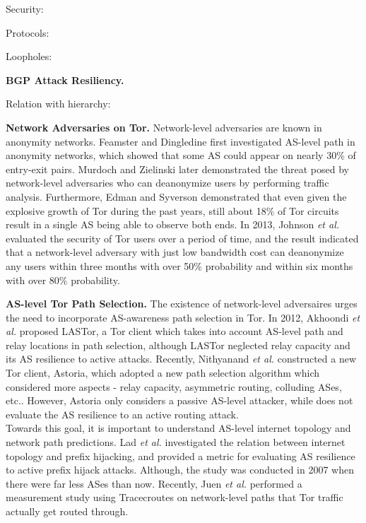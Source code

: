 \documentclass{acm_proc_article-sp}
\begin{document}
Security:
\cite{karlin2006pretty}
\cite{lychev2013bgp}
\cite{lad2006phas}
\cite{zhang2008ispy}
\cite{zheng2007light}
\cite{qiu2007detecting}
\cite{hu2007accurate}
\cite{shi2012detecting}
\cite{sriram2009comparative}
\cite{teoh2006bgp}
\cite{zhang2007practical}
\cite{qiu2009locating}
\cite{zhang2012studying}

Protocols:
\cite{van2007interdomain}
\cite{hu2004spv}
\cite{boldyreva2012provable}
\cite{chan2006modeling}
\cite{gill2011let}
\cite{zhang2009hc}

Loopholes:
\cite{arnbak2014loopholes}

{\bf BGP Attack Resiliency.}

\cite{lad2007understanding}

Relation with hierarchy:
\cite{zhao2012relation}
\cite{zhao2012analysis}

{\bf Network Adversaries on Tor.}
Network-level adversaries are known in anonymity networks. Feamster and Dingledine \cite{feamster2004location} first investigated AS-level path in anonymity networks, which showed that some AS could appear on nearly 30\% of entry-exit pairs. Murdoch and Zielinski \cite{murdoch2007sampled} later demonstrated the threat posed by network-level adversaries who can deanonymize users by performing traffic analysis. Furthermore, Edman and Syverson \cite{edman2009awareness} demonstrated that even given the explosive growth of Tor during the past years, still about 18\% of Tor circuits result in a single AS being able to observe both ends. In 2013, Johnson \emph{et al.} \cite{johnson2013users} evaluated the security of Tor users over a period of time, and the result indicated that a network-level adversary with just low bandwidth cost can deanonymize any users within three months with over 50\% probability and within six months with over 80\% probability.

{\bf AS-level Tor Path Selection.}
The existence of network-level adversaires urges the need to incorporate AS-awareness path selection in Tor. In 2012, Akhoondi \emph{et al.} \cite{akhoondi2012lastor} proposed LASTor, a Tor client which takes into account AS-level path and relay locations in path selection, although LASTor neglected relay capacity and its AS resilience to active attacks. Recently, Nithyanand \emph{et al.} \cite{starov2015measuring} constructed a new Tor client, Astoria, which adopted a new path selection algorithm which considered more aspects - relay capacity, asymmetric routing, colluding ASes, etc.. However, Astoria only considers a passive AS-level attacker, while does not evaluate the AS resilience to an active routing attack. \\
Towards this goal, it is important to understand AS-level internet topology and network path predictions. Lad \emph{et al.} \cite{lad2007understanding} investigated the relation between internet topology and prefix hijacking, and provided a metric for evaluating AS resilience to active prefix hijack attacks. Although, the study was conducted in 2007 when there were far less ASes than now. Recently, Juen \emph{et al.} \cite{juen2014defending} performed a measurement study using Tracecroutes on network-level paths that Tor traffic actually get routed through. 


{\footnotesize 
}

\end{document}
